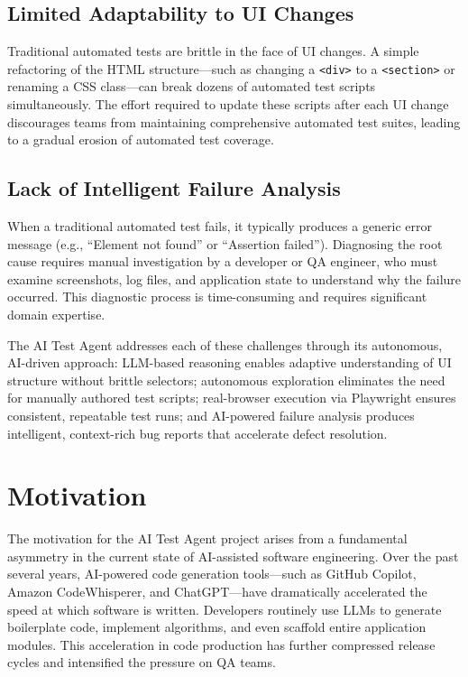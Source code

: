 \subsection{Limited Adaptability to UI Changes}
\label{subsec:adaptability}

Traditional automated tests are brittle in the face of UI changes. A simple refactoring of the HTML structure---such as changing a \texttt{<div>} to a \texttt{<section>} or renaming a CSS class---can break dozens of automated test scripts simultaneously. The effort required to update these scripts after each UI change discourages teams from maintaining comprehensive automated test suites, leading to a gradual erosion of automated test coverage.

\subsection{Lack of Intelligent Failure Analysis}
\label{subsec:failure_analysis}

When a traditional automated test fails, it typically produces a generic error message (e.g., ``Element not found'' or ``Assertion failed''). Diagnosing the root cause requires manual investigation by a developer or QA engineer, who must examine screenshots, log files, and application state to understand why the failure occurred. This diagnostic process is time-consuming and requires significant domain expertise.

The AI Test Agent addresses each of these challenges through its autonomous, AI-driven approach: LLM-based reasoning enables adaptive understanding of UI structure without brittle selectors; autonomous exploration eliminates the need for manually authored test scripts; real-browser execution via Playwright ensures consistent, repeatable test runs; and AI-powered failure analysis produces intelligent, context-rich bug reports that accelerate defect resolution.


\section{Motivation}
\label{sec:motivation}

The motivation for the AI Test Agent project arises from a fundamental asymmetry in the current state of AI-assisted software engineering. Over the past several years, AI-powered code generation tools---such as GitHub Copilot, Amazon CodeWhisperer, and ChatGPT---have dramatically accelerated the speed at which software is written. Developers routinely use LLMs to generate boilerplate code, implement algorithms, and even scaffold entire application modules. This acceleration in code production has further compressed release cycles and intensified the pressure on QA teams.

